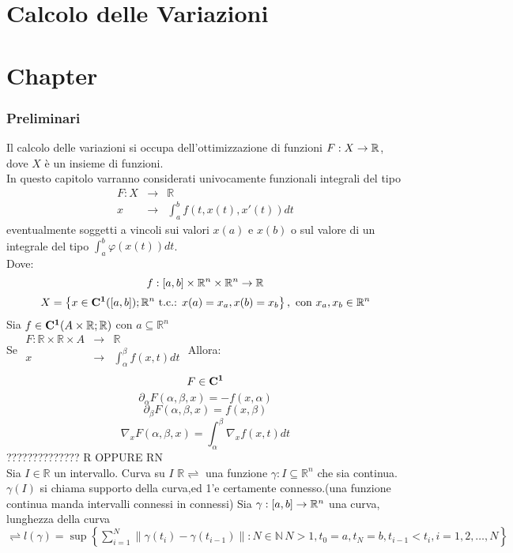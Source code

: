 \part{Calcolo delle Variazioni}
\part{Chapter}

\section{Preliminari}
Il calcolo delle variazioni si occupa dell'ottimizzazione di funzioni $F:X\to\mathbb{R}$, dove $X$ è un insieme di funzioni.\\
In questo capitolo varranno considerati univocamente funzionali integrali del tipo
$$\begin{array}{rcl} F: X & \to & \mathbb{R} \\
x & \to & \int_{a}^b f(t,x(t), x'(t))dt\end{array}$$
eventualmente soggetti a vincoli sui valori $x(a)$ e $x(b)$ o sul valore di un integrale del tipo $\int_a^b \varphi(x(t))dt$.\\
Dove:
$$f:\left[a,b\right]\times\mathbb{R}^n\times\mathbb{R}^n\to\mathbb{R}$$
$$X=\left\{x\in \mathbf{C^{1}}(\left[a,b\right]);\mathbb{R}^n\text{ t.c.: }x(a)=x_a, x(b)=x_b \right\},\text{ con }x_a,x_b\in\mathbb{R}^n$$
\proposition
Sia $f\in \mathbf{C^{1}}(A\times\mathbb{R};\mathbb{R})$ con $a\subseteq\mathbb{R}^n$\\
Se $\begin{array}{ccc} F: \mathbb{R}\times\mathbb{R}\times A & \to & \mathbb{R} \\
x & \to & \int_{\alpha}^\beta f(x,t)dt\end{array}$
Allora:
$$ F\in \mathbf{C^{1}}$$
$$ \partial_\alpha F(\alpha,\beta,x)=-f(x,\alpha)$$
$$ \partial_\beta F(\alpha,\beta,x)=f(x,\beta)$$
$$ \nabla_x F(\alpha,\beta,x)=\int_{\alpha}^{\beta}\nabla_xf(x,t)dt$$
 ?????????????? R OPPURE RN\\
Sia $I\in\mathbb{R}$ un intervallo. Curva su $I$ $\mathbb{R}\rightleftharpoons$ una funzione $\gamma:I\subseteq\mathbb{R}^n$ che sia continua.
\observation
$\gamma(I)$ si chiama supporto della curva,ed 1'e certamente connesso.(una funzione continua manda intervalli connessi in connessi)
Sia $\gamma:\left[a,b\right]\to\mathbb{R}^n$ una curva, lunghezza della curva $\rightleftharpoons l(\gamma)=\sup\left\{\sum\limits_{i=1}^{N}\left\|\gamma(t_i)-\gamma(t_{i-1})\right\|: N\in\mathbb{N}\,N>1,t_0=a,t_N=b,t_{i-1}<t_i, i=1,2,\ldots,N \right\}$ 
